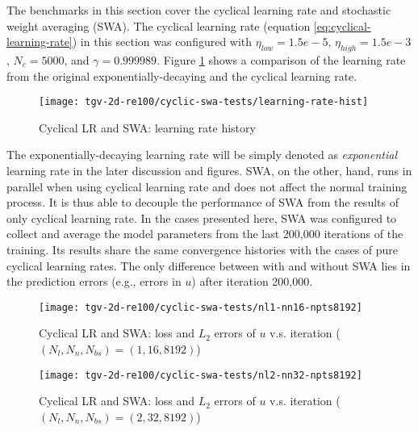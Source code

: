The benchmarks in this section cover the cyclical learning rate and stochastic weight averaging (SWA).
The cyclical learning rate (equation \eqref{eq:cyclical-learning-rate}) in this section was configured with $\eta_{low}=1.5e-5$, $\eta_{high}=1.5e-3$, $N_c=5000$, and $\gamma=0.999989$.
Figure \ref{fig:cyclic-swa-tests-lr-hist} shows a comparison of the learning rate from the original exponentially-decaying and the cyclical learning rate.
\begin{figure}[hbt!]
    \centering%
    \texttt{[image: tgv-2d-re100/cyclic-swa-tests/learning-rate-hist]}%
    \caption[%
        Cyclical LR and SWA: learning rate history%
    ]{%
        Cyclical LR and SWA: learning rate history%
    }\label{fig:cyclic-swa-tests-lr-hist}%
\end{figure}
The exponentially-decaying learning rate will be simply denoted as {\it exponential} learning rate in the later discussion and figures.
SWA, on the other, hand, runs in parallel when using cyclical learning rate and does not affect the normal training process.
It is thus able to decouple the performance of SWA from the results of only cyclical learning rate.
In the cases presented here, SWA was configured to collect and average the model parameters from the last 200,000 iterations of the training.
Its results share the same convergence histories with the cases of pure cyclical learning rates.
The only difference between with and without SWA lies in the prediction errors (e.g., errors in $u$) after iteration 200,000.

\begin{figure}[hbt!]
    \centering%
    \texttt{[image: tgv-2d-re100/cyclic-swa-tests/nl1-nn16-npts8192]}%
    \caption[%
        Cyclical LR and SWA: loss and $L_2$ errors of $u$ v.s. iteration ($(N_l, N_n, N_{bs})=(1, 16, 8192)$)%
    ]{%
        Cyclical LR and SWA: loss and $L_2$ errors of $u$ v.s. iteration ($(N_l, N_n, N_{bs})=(1, 16, 8192)$)%
    }\label{fig:cyclic-swa-tests-nl1-nn16-npts8192}%
\end{figure}

\begin{figure}[hbt!]
    \centering%
    \texttt{[image: tgv-2d-re100/cyclic-swa-tests/nl2-nn32-npts8192]}%
    \caption[%
        Cyclical LR and SWA: loss and $L_2$ errors of $u$ v.s. iteration ($(N_l, N_n, N_{bs})=(2, 32, 8192)$)%
    ]{%
        Cyclical LR and SWA: loss and $L_2$ errors of $u$ v.s. iteration ($(N_l, N_n, N_{bs})=(2, 32, 8192)$)%
    }\label{fig:cyclic-swa-tests-nl2-nn32-npts8192}%
\end{figure}

